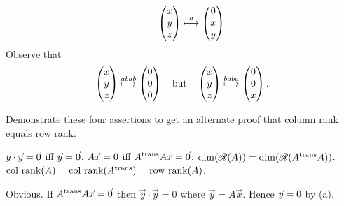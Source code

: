 \begin{exercises}
\begin{answer}
\begin{equation*}
        \qquad
        \begin{pmatrix} x \\ y \\ z \end{pmatrix}\stackrel{a}{\longmapsto}\begin{pmatrix} 0 \\ x \\ y \end{pmatrix}
      \end{equation*}
      Observe that
      \begin{equation*}
        \begin{pmatrix} x \\ y \\ z \end{pmatrix}\stackrel{abab}{\longmapsto}\begin{pmatrix} 0 \\ 0 \\ 0 \end{pmatrix}
        \quad\text{but}\quad
        \begin{pmatrix} x \\ y \\ z \end{pmatrix}\stackrel{baba}{\longmapsto}\begin{pmatrix} 0 \\ 0 \\ x \end{pmatrix}.
      \end{equation*} 
    \end{answer}
  \item  
    Demonstrate these four assertions to get an
    alternate proof that column rank equals row rank.
    \cite{Monthly66p1114}
    \begin{exparts}
      \partsitem \( \vec{y}\cdot\vec{y}=\vec{0} \) iff \( \vec{y}=\vec{0} \).
      \partsitem \( A\vec{x}=\vec{0} \) iff \( {{A}^{\rm trans}}A\vec{x}=\vec{0} \).
      \partsitem \( \dim(\mathscr{R}(A))=\dim(\mathscr{R}({{A}^{\rm trans}}A)) \).
      \partsitem \( \text{col rank}(A)=\text{col rank}({{A}^{\rm trans}})
        =\text{row rank}(A) \).
    \end{exparts}
    \begin{answer}
      \answerasgiven
      \begin{exparts}
        \partsitem Obvious.
        \partsitem If \( {{A}^{\rm trans}}A\vec{x}=\vec{0} \) then 
          \( \vec{y}\cdot\vec{y}=0 \)
          where \( \vec{y}=A\vec{x} \).
          Hence \( \vec{y}=\vec{0} \) by (a).


\end{exparts}
\end{answer}
\end{exercises}
